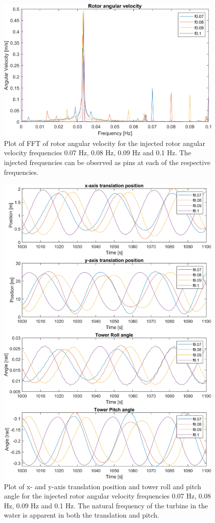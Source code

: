 \begin{figure}[h]
	\centering
	\includegraphics[width=0.8\linewidth]{Graphics/TestResults/tj00/tjj0_f07to1_OmegaFFT.png}
	\caption{Plot of FFT of rotor angular velocity for the injected rotor angular velocity frequencies 0.07 Hz, 0.08 Hz, 0.09 Hz and 0.1 Hz. The injected frequencies can be observed as pins at each of the respective frequencies.}
	\label{fig:tjj0_f07to1_OmegaFFT}
\end{figure}

\begin{figure}[h]
	\centering
	\includegraphics[width=0.8\linewidth]{Graphics/TestResults/tj00/tjj0_f07to1_xPosToPitchAng.png}
	\caption{Plot of x- and y-axis translation position and tower roll and pitch angle for the injected rotor angular velocity frequencies 0.07 Hz, 0.08 Hz, 0.09 Hz and 0.1 Hz. The natural frequency of the turbine in the water is apparent in both the translation and pitch.}
	\label{fig:tjj0_f07to1_xPosToPitchAng}
\end{figure}

